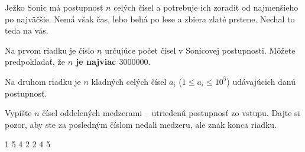 




Ježko Sonic má postupnosť $n$ celých čísel a potrebuje ich zoradiť od najmenšieho po najväčšie. Nemá
však čas, lebo behá po lese a zbiera zlaté prstene. Nechal to teda na vás.


Na prvom riadku je číslo $n$ určujúce počet čísel v Sonicovej postupnosti. Môžete predpokladať, že
\textbf{$n$ je najviac $3000000$}.

Na druhom riadku je $n$ kladných celých čísel $a_i$ ($1 \leq a_i \leq 10^5$) udávajúcich danú
postupnosť.


Vypíšte $n$ čísel oddelených medzerami -- utriedenú postupnosť zo vstupu. Dajte si pozor, aby ste
za posledným číslom nedali medzeru, ale znak konca riadku.


1 5 4 2
 2 4 5
\koniec


